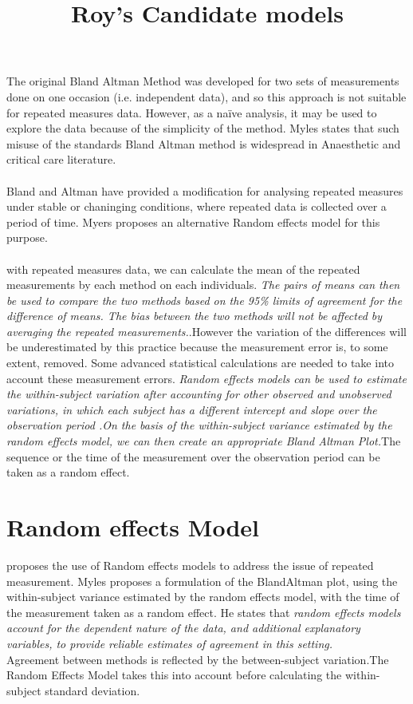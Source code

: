 \documentclass[12pt, a4paper]{report}
\theoremstyle{plain}
\theoremstyle{definition}
\theoremstyle{remark}
\begin{document}
\title{Roy's Candidate models}
The original Bland Altman Method was developed for two sets of
measurements done on one occasion (i.e. independent data), and so
this approach is not suitable for repeated measures data. However,
as a naïve analysis, it may be used to explore the data because of
the simplicity of the method. Myles states that such misuse of the
standards Bland Altman method is widespread in Anaesthetic and
critical care literature.
\\
\\
Bland and Altman have provided a modification for analysing
repeated measures under stable or chaninging conditions, where
repeated data is collected over a period of time. Myers proposes
an alternative Random effects model for this purpose.
\\
\\
with repeated measures data, we can
calculate the mean of the repeated measurements by each method on
each individuals. \emph{ The pairs of means can then be used to
	compare the two methods based on the 95\% limits of agreement for
	the difference of means. The bias between the two methods will not
	be affected by averaging the repeated measurements.}.However the
variation of the differences will be underestimated by this
practice because the measurement error is, to some extent,
removed. Some advanced statistical calculations are needed to take
into account these measurement errors. \emph{Random effects models
	can be used to estimate the within-subject variation after
	accounting for other observed and unobserved variations, in which
	each subject has a different intercept and slope over the
	observation period .On the basis of the within-subject variance
	estimated by the random effects model, we can then create an
	appropriate Bland Altman Plot.}The sequence or the time of the
measurement over the observation period can be taken as a random
effect.
\section{Random effects Model} \citet{Myles} proposes the use of
Random effects models to address the issue of repeated
measurement. Myles proposes a formulation of the BlandAltman
plot, using the within-subject variance estimated by the random
effects model, with the time of the measurement taken as a random
effect. He states that \emph{random effects models account for the
	dependent nature of the data, and additional explanatory
	variables, to provide reliable estimates of agreement in this
	setting.}
\\
Agreement between methods is reflected by the between-subject
variation.The Random Effects Model takes this into account before
calculating the within-subject standard deviation.
\end{document}
